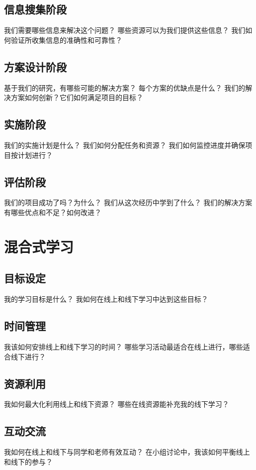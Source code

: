 \documentclass[12pt]{book}
\begin{document}
\subsection{信息搜集阶段}
我们需要哪些信息来解决这个问题？
哪些资源可以为我们提供这些信息？
我们如何验证所收集信息的准确性和可靠性？

\subsection{方案设计阶段}
基于我们的研究，有哪些可能的解决方案？
每个方案的优缺点是什么？
我们的解决方案如何创新？它们如何满足项目的目标？

\subsection{实施阶段}
我们的实施计划是什么？
我们如何分配任务和资源？
我们如何监控进度并确保项目按计划进行？

\subsection{评估阶段}
我们的项目成功了吗？为什么？
我们从这次经历中学到了什么？
我们的解决方案有哪些优点和不足？如何改进？

\section{混合式学习}
\subsection{目标设定}
我的学习目标是什么？
我如何在线上和线下学习中达到这些目标？

\subsection{时间管理}
我该如何安排线上和线下学习的时间？
哪些学习活动最适合在线上进行，哪些适合线下进行？

\subsection{资源利用}
我如何最大化利用线上和线下资源？
哪些在线资源能补充我的线下学习？

\subsection{互动交流}
我如何在线上和线下与同学和老师有效互动？
在小组讨论中，我该如何平衡线上和线下的参与？
\end{document}
